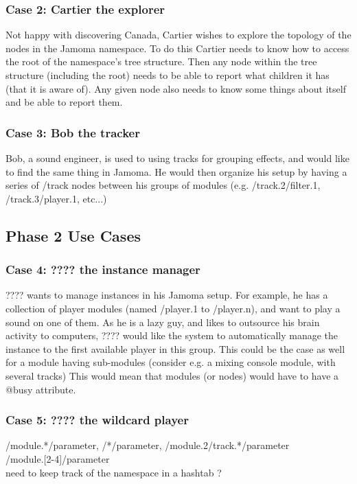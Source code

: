 \documentclass[]{article}
\begin{document}
\subsubsection{Case 2: Cartier the explorer}

Not happy with discovering Canada, Cartier wishes to explore the topology of the nodes in the Jamoma namespace.  To do this Cartier needs to know how to access the root of the namespace's tree structure.  Then any node within the tree structure (including the root) needs to be able to report what children it has (that it is aware of).  Any given node also needs to know some things about itself and be able to report them.

\subsubsection{Case 3: Bob the tracker}
Bob, a sound engineer, is used to using tracks for grouping effects, and would like to find the same thing in Jamoma. He would then organize his setup by having a series of /track nodes between his groups of modules (e.g. /track.2/filter.1, /track.3/player.1, etc...)


\subsection{Phase 2 Use Cases}

\subsubsection{Case 4: ???? the instance manager}
???? wants to manage instances in his Jamoma setup. For example, he has a collection of player modules (named /player.1 to /player.n), and want to play a sound on one of them. As he is a lazy guy, and likes to outsource his brain activity to computers, ???? would like the system to automatically manage the instance to the first available player in this group. This could be the case as well for a module having sub-modules (consider e.g. a mixing console module, with several tracks) This would mean that modules (or nodes) would have to have a @busy attribute. 

\subsubsection{Case 5: ???? the wildcard player}
/module.*/parameter, /*/parameter, /module.2/track.*/parameter\\
/module.[2-4]/parameter\\
need to keep track of the namespace in a hashtab ?
\end{document}
